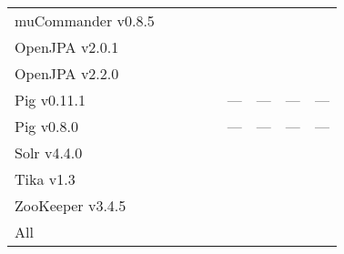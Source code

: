 \begin{table*}[t]
\begin{tabular}{l|rr|rr||rr|rr}
    muCommander v0.8.5  &               &               &               &               &               &               &               &           \\
    OpenJPA v2.0.1      &               &               &               &               &               &               &               &           \\
    OpenJPA v2.2.0      &               &               &               &               &               &               &               &           \\
    Pig v0.11.1         &               &               &               &               & ---           & ---           & ---           & ---       \\
    Pig v0.8.0          &               &               &               &               & ---           & ---           & ---           & ---       \\
    Solr v4.4.0         &               &               &               &               &               &               &               &           \\
    Tika v1.3           &               &               &               &               &               &               &               &           \\
    ZooKeeper v3.4.5    &               &               &               &               &               &               &               &           \\
    \midrule
    All                 &               &               &               &               &               &               &               &           \\
    \bottomrule
\end{tabular}
\label{table:mrr:classes}
\end{table*}

